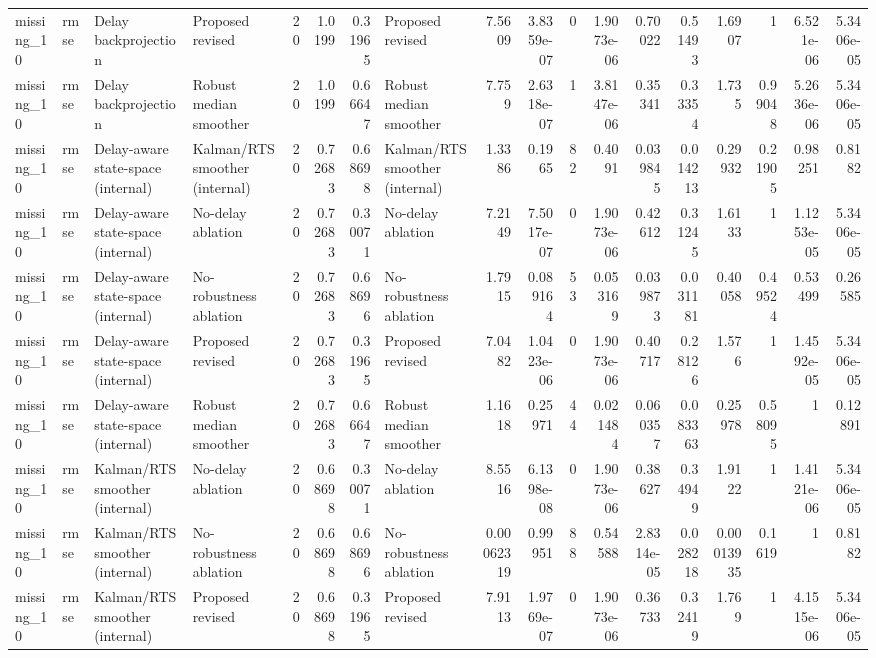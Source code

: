 \begin{table}[!htbp]
{\begin{tabular}{llllrrrlrrrrrrrrrr}
missing_10 & rmse & Delay backprojection & Proposed revised & 20 & 1.0199 & 0.31965 & Proposed revised & 7.5609 & 3.8359e-07 & 0 & 1.9073e-06 & 0.70022 & 0.51493 & 1.6907 & 1 & 6.521e-06 & 5.3406e-05 \\
missing_10 & rmse & Delay backprojection & Robust median smoother & 20 & 1.0199 & 0.66647 & Robust median smoother & 7.759 & 2.6318e-07 & 1 & 3.8147e-06 & 0.35341 & 0.33354 & 1.735 & 0.99048 & 5.2636e-06 & 5.3406e-05 \\
missing_10 & rmse & Delay-aware state-space (internal) & Kalman/RTS smoother (internal) & 20 & 0.72683 & 0.68698 & Kalman/RTS smoother (internal) & 1.3386 & 0.1965 & 82 & 0.4091 & 0.039845 & 0.014213 & 0.29932 & 0.21905 & 0.98251 & 0.8182 \\
missing_10 & rmse & Delay-aware state-space (internal) & No-delay ablation & 20 & 0.72683 & 0.30071 & No-delay ablation & 7.2149 & 7.5017e-07 & 0 & 1.9073e-06 & 0.42612 & 0.31245 & 1.6133 & 1 & 1.1253e-05 & 5.3406e-05 \\
missing_10 & rmse & Delay-aware state-space (internal) & No-robustness ablation & 20 & 0.72683 & 0.68696 & No-robustness ablation & 1.7915 & 0.089164 & 53 & 0.053169 & 0.039873 & 0.031181 & 0.40058 & 0.49524 & 0.53499 & 0.26585 \\
missing_10 & rmse & Delay-aware state-space (internal) & Proposed revised & 20 & 0.72683 & 0.31965 & Proposed revised & 7.0482 & 1.0423e-06 & 0 & 1.9073e-06 & 0.40717 & 0.28126 & 1.576 & 1 & 1.4592e-05 & 5.3406e-05 \\
missing_10 & rmse & Delay-aware state-space (internal) & Robust median smoother & 20 & 0.72683 & 0.66647 & Robust median smoother & 1.1618 & 0.25971 & 44 & 0.021484 & 0.060357 & 0.083363 & 0.25978 & 0.58095 & 1 & 0.12891 \\
missing_10 & rmse & Kalman/RTS smoother (internal) & No-delay ablation & 20 & 0.68698 & 0.30071 & No-delay ablation & 8.5516 & 6.1398e-08 & 0 & 1.9073e-06 & 0.38627 & 0.34949 & 1.9122 & 1 & 1.4121e-06 & 5.3406e-05 \\
missing_10 & rmse & Kalman/RTS smoother (internal) & No-robustness ablation & 20 & 0.68698 & 0.68696 & No-robustness ablation & 0.00062319 & 0.99951 & 88 & 0.54588 & 2.8314e-05 & 0.028218 & 0.00013935 & 0.1619 & 1 & 0.8182 \\
missing_10 & rmse & Kalman/RTS smoother (internal) & Proposed revised & 20 & 0.68698 & 0.31965 & Proposed revised & 7.9113 & 1.9769e-07 & 0 & 1.9073e-06 & 0.36733 & 0.32419 & 1.769 & 1 & 4.1515e-06 & 5.3406e-05 \\

\end{tabular}}
\end{table}
